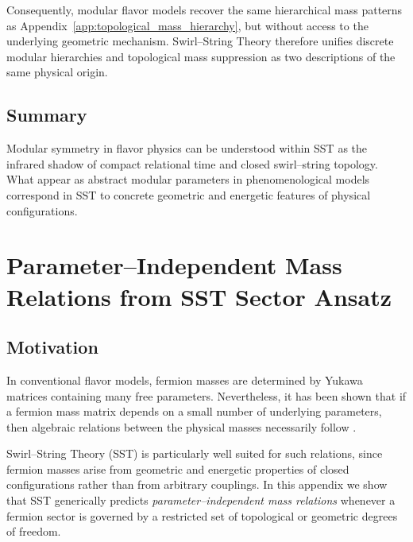 \documentclass[11pt]{article}
\begin{document}
            Consequently, modular flavor models recover the same hierarchical mass patterns
            as Appendix~\ref{app:topological_mass_hierarchy}, but without access to the
            underlying geometric mechanism.
            Swirl--String Theory therefore unifies discrete modular hierarchies and
            topological mass suppression as two descriptions of the same physical origin.

        \subsection{Summary}

            Modular symmetry in flavor physics can be understood within SST as the infrared
            shadow of compact relational time and closed swirl--string topology.
            What appear as abstract modular parameters in phenomenological models correspond
            in SST to concrete geometric and energetic features of physical configurations.



    \section{Parameter--Independent Mass Relations from SST Sector Ansatz}
    \label{app:parameter_independent_mass_relations}

    \subsection{Motivation}

        In conventional flavor models, fermion masses are determined by Yukawa matrices
        containing many free parameters.
        Nevertheless, it has been shown that if a fermion mass matrix depends on a small
        number of underlying parameters, then algebraic relations between the physical
        masses necessarily follow \cite{KoideNishiura2018U3}.

        Swirl--String Theory (SST) is particularly well suited for such relations, since
        fermion masses arise from geometric and energetic properties of closed
        configurations rather than from arbitrary couplings.
        In this appendix we show that SST generically predicts \emph{parameter--independent
    mass relations} whenever a fermion sector is governed by a restricted set of
        topological or geometric degrees of freedom.
\end{document}
